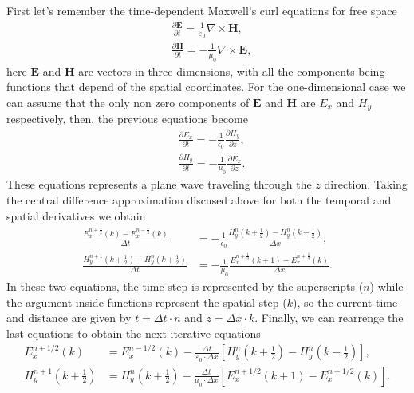\documentclass[12pt, oneside]{book}
\begin{document}
First let's remember the time-dependent Maxwell's curl equations for free space \cite{jackson, griffiths}
\begin{align}
    &\frac{\partial \boldsymbol{E}}{\partial t}=\frac{1}{\varepsilon_{0}} \nabla \times \boldsymbol{H}, \\
    &\frac{\partial \boldsymbol{H}}{\partial t}=-\frac{1}{\mu_{0}} \nabla \times \boldsymbol{E},
\end{align}
here $\boldsymbol{E}$ and $\boldsymbol{H}$ are vectors in three dimensions, with all the components being functions that depend of the spatial coordinates. For the one-dimensional case we can assume that the only non zero components of $\boldsymbol{E}$ and $\boldsymbol{H}$ are $E_x$ and $H_y$ respectively, then, the previous equations become
\begin{align}
    & \frac{\partial E_x}{\partial t}=-\frac{1}{\epsilon_0}  \frac{\partial H_y}{\partial z}, \\
    & \frac{\partial H_y}{\partial t}=-\frac{1}{\mu_0} \frac{\partial E_x}{\partial z}.
\end{align}
These equations represents a plane wave traveling through the $z$ direction. Taking the central difference approximation discused above for both the temporal and spatial derivatives we obtain \cite{Sullivan2020}
\begin{align}
    \frac{E_x^{n+\frac{1}{2}}(k)-E_x^{n-\frac{1}{2}}(k)}{\Delta t} &=-\frac{1}{\epsilon_0}\frac{H_y^n \left(k+\frac{1}{2}\right) - H_y^n\left(k-\frac{1}{2}\right)}{\Delta x}, \\
    \frac{H_y^{n+1} \left(k+\frac{1}{2}\right) -H_y^{n}\left( k +\frac{1}{2}\right)}{\Delta t} &=-\frac{1}{\mu_0}\frac{E_x^{n+\frac{1}{2}} \left(k+1\right) - E_x^{n+\frac{1}{2}}\left(k\right)}{\Delta x}.
\end{align}
In these two equations, the time step is represented by the superscripts ($n$) while the argument inside functions represent the spatial step ($k$), so the current time and distance are given by $t = \Delta t \cdot n$ and $z = \Delta x \cdot k$. Finally, we can rearrenge the last equations to obtain the next iterative equations
\begin{align}
    E_{x}^{n+1 / 2}(k) &=E_{x}^{n-1 / 2}(k)-\frac{\Delta t}{\varepsilon_{0} \cdot \Delta x}\left[H_{y}^{n}\left(k+\frac{1}{2}\right)-H_{y}^{n}\left(k-\frac{1}{2}\right)\right], \\
    H_{y}^{n+1}\left(k+\frac{1}{2}\right) &=H_{y}^{n}\left(k+\frac{1}{2}\right)-\frac{\Delta t}{\mu_{0} \cdot \Delta x}\left[E_{x}^{n+1 / 2}(k+1)-E_{x}^{n+1 / 2}(k)\right].
\end{align}
\end{document}
